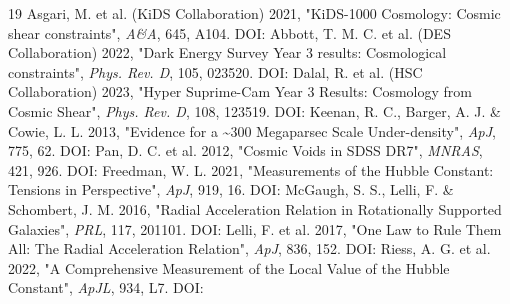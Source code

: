 \documentclass[11pt,a4paper]{article}
\begin{document}
{\begin{thebibliography}{19}
 Asgari, M. et al. (KiDS Collaboration) 2021, "KiDS-1000 Cosmology: Cosmic shear constraints", \emph{A\&A}, 645, A104. DOI: \href{https://doi.org/10.1051/0004-6361/202039070}{{\small\protect{}}}
 Abbott, T. M. C. et al. (DES Collaboration) 2022, "Dark Energy Survey Year 3 results: Cosmological constraints", \emph{Phys. Rev. D}, 105, 023520. DOI: \href{https://doi.org/10.1103/PhysRevD.105.023520}{{\small\protect{}}}
 Dalal, R. et al. (HSC Collaboration) 2023, "Hyper Suprime-Cam Year 3 Results: Cosmology from Cosmic Shear", \emph{Phys. Rev. D}, 108, 123519. DOI: \href{https://doi.org/10.1103/PhysRevD.108.123519}{{\small\protect{}}}
 Keenan, R. C., Barger, A. J. \& Cowie, L. L. 2013, "Evidence for a \~{}300 Megaparsec Scale Under-density", \emph{ApJ}, 775, 62. DOI: \href{https://doi.org/10.1088/0004-637X/775/1/62}{{\small\protect{}}}
 Pan, D. C. et al. 2012, "Cosmic Voids in SDSS DR7", \emph{MNRAS}, 421, 926. DOI: \href{https://doi.org/10.1111/j.1365-2966.2011.20197.x}{{\small\protect{}}}
 Freedman, W. L. 2021, "Measurements of the Hubble Constant: Tensions in Perspective", \emph{ApJ}, 919, 16. DOI: \href{https://doi.org/10.3847/1538-4357/ac0e95}{{\small\protect{}}}
 McGaugh, S. S., Lelli, F. \& Schombert, J. M. 2016, "Radial Acceleration Relation in Rotationally Supported Galaxies", \emph{PRL}, 117, 201101. DOI: \href{https://doi.org/10.1103/PhysRevLett.117.201101}{{\small\protect{}}}
 Lelli, F. et al. 2017, "One Law to Rule Them All: The Radial Acceleration Relation", \emph{ApJ}, 836, 152. DOI: \href{https://doi.org/10.3847/1538-4357/836/2/152}{{\small\protect{}}}
 Riess, A. G. et al. 2022, "A Comprehensive Measurement of the Local Value of the Hubble Constant", \emph{ApJL}, 934, L7. DOI: \href{https://doi.org/10.3847/2041-8213/ac5c5b}{{\small\protect{}}}
\end{thebibliography}
}
\end{document}
